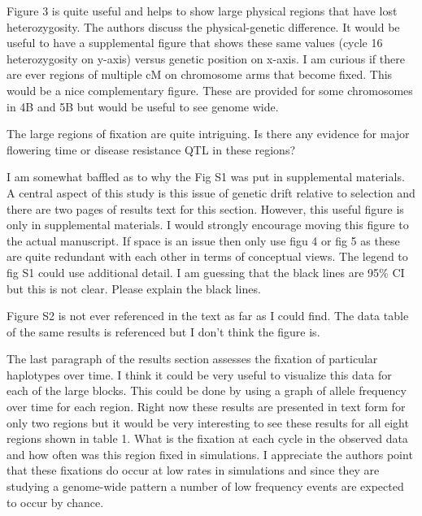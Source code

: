 \documentclass[onecolumn,oneside,letterpaper]{article}
\begin{document}
Figure 3 is quite useful and helps to show large physical regions that have lost 
heterozygosity.  The authors discuss the physical-genetic difference.  It would 
be useful to have a supplemental figure that shows these same values (cycle 16 
heterozygosity on y-axis) versus genetic position on x-axis.  I am curious if 
there are ever regions of multiple cM on chromosome arms that become fixed.  
This would be a nice complementary figure.  These are provided for some 
chromosomes in 4B and 5B but would be useful to see genome wide.  


The large regions of fixation are quite intriguing.  Is there any evidence for 
major flowering time or disease resistance QTL in these regions?


I am somewhat baffled as to why the Fig S1 was put in supplemental materials.  A 
central aspect of this study is this issue of genetic drift relative to 
selection and there are two pages of results text for this section.  However, 
this useful figure is only in supplemental materials.  I would strongly 
encourage moving this figure to the actual manuscript.  If space is an issue 
then only use figu 4 or fig 5 as these are quite redundant with each other in 
terms of conceptual views. 
The legend to fig S1 could use additional detail.  I am guessing that the black 
lines are 95\% CI but this is not clear.  Please explain the black lines.


Figure S2 is not ever referenced in the text as far as I could find.  The data 
table of the same results is referenced but I don’t think the figure is.  


The last paragraph of the results section assesses the fixation of particular 
haplotypes over time.  I think it could be very useful to visualize this data 
for each of the large blocks.  This could be done by using a graph of allele 
frequency over time for each region.  Right now these results are presented in 
text form for only two regions but it would be very interesting to see these 
results for all eight regions shown in table 1.  What is the fixation at each 
cycle in the observed data and how often was this region fixed in simulations.  
I appreciate the authors point that these fixations do occur at low rates in 
simulations and since they are studying a genome-wide pattern a number of low 
frequency events are expected to occur by chance.
\end{document}
